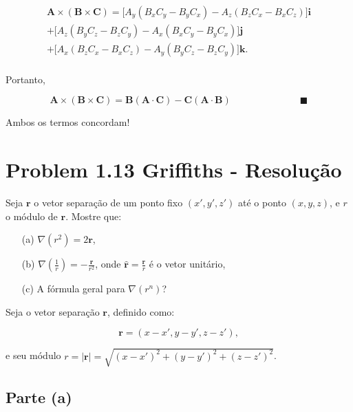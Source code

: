 \documentclass[a4paper,12pt]{article}
\begin{document}
\begin{equation}
    \boxed{
    \begin{aligned}
    \mathbf{A} \times (\mathbf{B} \times \mathbf{C}) = \Big[ A_y(B_xC_y - B_yC_x) - A_z(B_zC_x - B_xC_z) \Big] \mathbf{i} \\ +
    \Big[A_z(B_yC_z - B_zC_y) - A_x(B_xC_y - B_yC_x) \Big] \mathbf{j}\\ +
    \Big[ A_x(B_zC_x - B_xC_z) - A_y(B_yC_z - B_zC_y) \Big] \mathbf{k}.
\end{aligned}
    }
\end{equation}\\

Portanto,

\begin{equation}
    \mathbf{A} \times (\mathbf{B} \times \mathbf{C}) =\mathbf{B} (\mathbf{A} \cdot \mathbf{C}) - \mathbf{C} (\mathbf{A} \cdot \mathbf{B}) \hspace{3cm} \blacksquare
\end{equation}


Ambos os termos concordam!


\section*{Problem 1.13 Griffiths - Resolu\c{c}\~ao}

Seja \(\mathbf{r}\) o vetor separação de um ponto fixo \((x', y', z')\) até o ponto \((x, y, z)\), e \(r\) o módulo de \(\mathbf{r}\). Mostre que:

\begin{enumerate}
    \item[(a)] \(\nabla (r^2) = 2\mathbf{r}\),
    \item[(b)] \(\nabla \left(\frac{1}{r}\right) = -\frac{\hat{\mathbf{r}}}{r^2}\), onde \(\hat{\mathbf{r}} = \frac{\mathbf{r}}{r}\) é o vetor unitário,
    \item[(c)] A fórmula geral para \(\nabla (r^n)\)?
\end{enumerate}


Seja o vetor separação \(\mathbf{r}\), definido como:

\begin{equation}
\mathbf{r} = (x - x', y - y', z - z'),
\end{equation}

e seu módulo \(r = |\mathbf{r}| = \sqrt{(x - x')^2 + (y - y')^2 + (z - z')^2}\).

\subsection*{Parte (a)}
\end{document}

